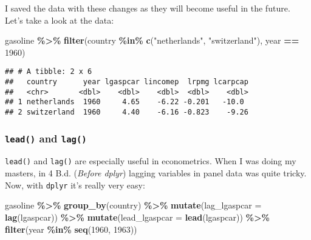 \documentclass[
]{article}
\newenvironment{Shaded}{\begin{snugshade}}{\end{snugshade}}
\newcommand{\DataTypeTok}[1]{\textcolor[rgb]{0.13,0.29,0.53}{#1}}
\newcommand{\DecValTok}[1]{\textcolor[rgb]{0.00,0.00,0.81}{#1}}
\newcommand{\KeywordTok}[1]{\textcolor[rgb]{0.13,0.29,0.53}{\textbf{#1}}}
\newcommand{\NormalTok}[1]{#1}
\newcommand{\OperatorTok}[1]{\textcolor[rgb]{0.81,0.36,0.00}{\textbf{#1}}}
\newcommand{\StringTok}[1]{\textcolor[rgb]{0.31,0.60,0.02}{#1}}
\begin{document}
I saved the data with these changes as they will become useful in the future. Let's take a look at
the data:

\begin{Shaded}
\begin{Highlighting}[]
\NormalTok{gasoline }\OperatorTok{\%\textgreater{}\%}
\StringTok{  }\KeywordTok{filter}\NormalTok{(country }\OperatorTok{\%in\%}\StringTok{ }\KeywordTok{c}\NormalTok{(}\StringTok{"netherlands"}\NormalTok{, }\StringTok{"switzerland"}\NormalTok{), year }\OperatorTok{==}\StringTok{ }\DecValTok{1960}\NormalTok{)}
\end{Highlighting}
\end{Shaded}

\begin{verbatim}
## # A tibble: 2 x 6
##   country      year lgaspcar lincomep  lrpmg lcarpcap
##   <chr>       <dbl>    <dbl>    <dbl>  <dbl>    <dbl>
## 1 netherlands  1960     4.65    -6.22 -0.201   -10.0 
## 2 switzerland  1960     4.40    -6.16 -0.823    -9.26
\end{verbatim}

\hypertarget{lead-and-lag}{%
\subsubsection{\texorpdfstring{\texttt{lead()} and \texttt{lag()}}{lead() and lag()}}\label{lead-and-lag}}

\texttt{lead()} and \texttt{lag()} are especially useful in econometrics. When I was doing my masters, in 4 B.d.
(\emph{Before dplyr}) lagging variables in panel data was quite tricky. Now, with \texttt{dplyr} it's really
very easy:

\begin{Shaded}
\begin{Highlighting}[]
\NormalTok{gasoline }\OperatorTok{\%\textgreater{}\%}
\StringTok{  }\KeywordTok{group\_by}\NormalTok{(country) }\OperatorTok{\%\textgreater{}\%}
\StringTok{  }\KeywordTok{mutate}\NormalTok{(}\DataTypeTok{lag\_lgaspcar =} \KeywordTok{lag}\NormalTok{(lgaspcar)) }\OperatorTok{\%\textgreater{}\%}
\StringTok{  }\KeywordTok{mutate}\NormalTok{(}\DataTypeTok{lead\_lgaspcar =} \KeywordTok{lead}\NormalTok{(lgaspcar)) }\OperatorTok{\%\textgreater{}\%}
\StringTok{  }\KeywordTok{filter}\NormalTok{(year }\OperatorTok{\%in\%}\StringTok{ }\KeywordTok{seq}\NormalTok{(}\DecValTok{1960}\NormalTok{, }\DecValTok{1963}\NormalTok{))}
\end{Highlighting}
\end{Shaded}
\end{document}
